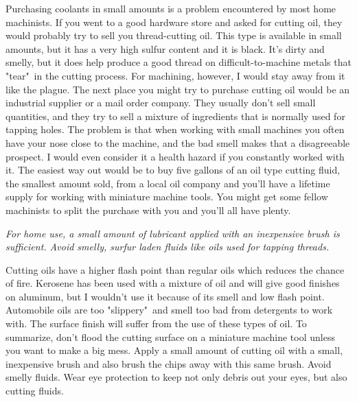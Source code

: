 
Purchasing coolants in small amounts is a problem encountered by most home
machinists. If you went to a good hardware store and asked for cutting oil, they
would probably try to sell you thread-cutting oil. This type is available in
small amounts, but it has a very high sulfur content and it is black. It's dirty
and smelly, but it does help produce a good thread on difficult-to-machine
metals that "tear"\ in the cutting process. For machining, however, I would stay
away from it like the plague. The next place you might try to purchase cutting
oil would be an industrial supplier or a mail order company. They usually don't
sell small quantities, and they try to sell a mixture of ingredients that is normally used for
tapping holes. The problem is that when working with small machines you often
have your nose close to the machine, and the bad smell makes that a disagreeable
prospect. I would even consider it a health hazard if you constantly worked with
it. The easiest way out would be to buy five gallons of an oil type cutting
fluid, the smallest amount sold, from a local oil company and you'll have a
lifetime supply for working with miniature machine tools. You might get some
fellow machinists to split the purchase with you and you'll all have plenty.

\bigskip
\textit{For home use, a small amount of lubricant applied with an inexpensive
brush is sufficient. Avoid smelly, surfur laden fluids like oils used for
tapping threads.}
\bigskip


Cutting oils have a higher flash point than regular oils which reduces the
chance of fire. Kerosene has been used with a mixture of oil and will give good
finishes on aluminum, but I wouldn't use it because of its smell and low flash
point. Automobile oils are too "slippery"\ and smell too bad from detergents to
work with. The surface finish will suffer from the use of these types of oil. To
summarize, don't flood the cutting surface on a miniature machine tool unless
you want to make a big mess. Apply a small amount of cutting oil with a small,
inexpensive brush and also brush the chips away with this same brush. Avoid
smelly fluids. Wear eye protection to keep not only debris out your eyes, but
also cutting fluids.



\secup
